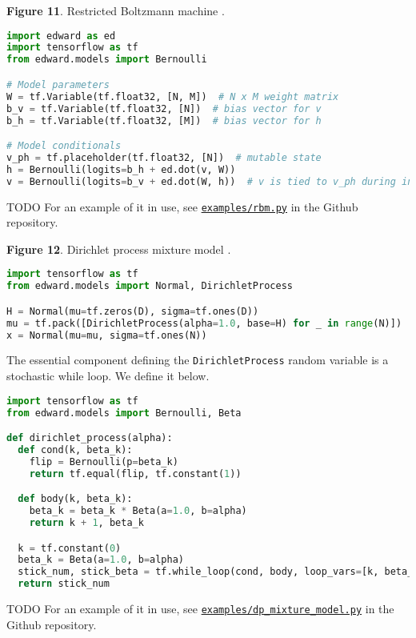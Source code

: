 \textbf{Figure 11}. Restricted Boltzmann machine \citep{smolensky1986information}.
\begin{lstlisting}[language=python]
import edward as ed
import tensorflow as tf
from edward.models import Bernoulli

# Model parameters
W = tf.Variable(tf.float32, [N, M])  # N x M weight matrix
b_v = tf.Variable(tf.float32, [N])  # bias vector for v
b_h = tf.Variable(tf.float32, [M])  # bias vector for h

# Model conditionals
v_ph = tf.placeholder(tf.float32, [N])  # mutable state
h = Bernoulli(logits=b_h + ed.dot(v, W))
v = Bernoulli(logits=b_v + ed.dot(W, h))  # v is tied to v_ph during inference
\end{lstlisting}
TODO
For an example of it in use, see
\href{https://github.com/blei-lab/edward/blob/master/examples/rbm.py}{\texttt{examples/rbm.py}}
in the Github repository.

\textbf{Figure 12}. Dirichlet process mixture model \citep{antoniak1974mixtures}.
\begin{lstlisting}[language=python]
import tensorflow as tf
from edward.models import Normal, DirichletProcess

H = Normal(mu=tf.zeros(D), sigma=tf.ones(D))
mu = tf.pack([DirichletProcess(alpha=1.0, base=H) for _ in range(N)])
x = Normal(mu=mu, sigma=tf.ones(N))
\end{lstlisting}
The essential component defining the \texttt{DirichletProcess} random
variable is a stochastic while loop. We define it below.
\begin{lstlisting}[language=python]
import tensorflow as tf
from edward.models import Bernoulli, Beta

def dirichlet_process(alpha):
  def cond(k, beta_k):
    flip = Bernoulli(p=beta_k)
    return tf.equal(flip, tf.constant(1))

  def body(k, beta_k):
    beta_k = beta_k * Beta(a=1.0, b=alpha)
    return k + 1, beta_k

  k = tf.constant(0)
  beta_k = Beta(a=1.0, b=alpha)
  stick_num, stick_beta = tf.while_loop(cond, body, loop_vars=[k, beta_k])
  return stick_num
\end{lstlisting}
TODO
For an example of it in use, see
\href{https://github.com/blei-lab/edward/blob/master/examples/dp_mixture_model.py}{\texttt{examples/dp_mixture_model.py}}
in the Github repository.

